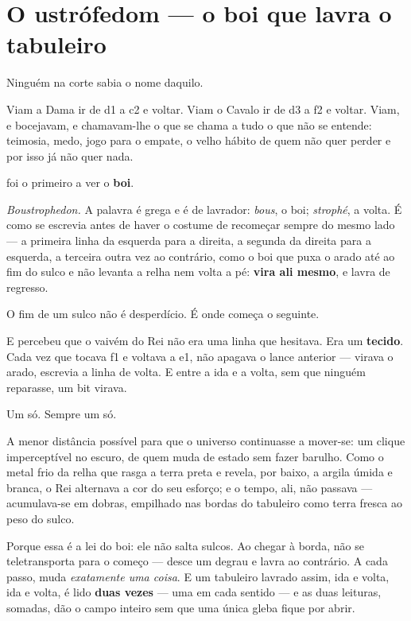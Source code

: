 \documentclass[livro.tex]{subfiles}
\begin{document}
\chapter{O ustrófedom --- o boi que lavra o tabuleiro}

Ninguém na corte sabia o nome daquilo.

Viam a Dama ir de \textsf{d1} a \textsf{c2} e voltar. Viam o Cavalo ir de \textsf{d3} a \textsf{f2} e voltar.
Viam, e bocejavam, e chamavam-lhe o que se chama a tudo o que não se entende:
teimosia, medo, jogo para o empate, o velho hábito de quem não quer perder e por
isso já não quer nada.

\Joa foi o primeiro a ver o \textbf{boi}.

\medskip

\emph{Boustrophedon.} A palavra é grega e é de lavrador: \emph{bous}, o boi;
\emph{strophé}, a volta. É como se escrevia antes de haver o costume de recomeçar
sempre do mesmo lado --- a primeira linha da esquerda para a direita, a segunda da
direita para a esquerda, a terceira outra vez ao contrário, como o boi que puxa o
arado até ao fim do sulco e não levanta a relha nem volta a pé: \textbf{vira ali
mesmo}, e lavra de regresso.

O fim de um sulco não é desperdício. É onde começa o seguinte.

\medskip

E \Joa percebeu que o vaivém do Rei não era uma linha que hesitava. Era um
\textbf{tecido}. Cada vez que \Ben tocava \textsf{f1} e voltava a \textsf{e1}, não apagava o
lance anterior --- virava o arado, escrevia a linha de volta. E entre a ida e a
volta, sem que ninguém reparasse, um bit virava.

Um só. Sempre um só.

\medskip

A menor distância possível para que o universo continuasse a mover-se: um clique
imperceptível no escuro, de quem muda de estado sem fazer barulho. Como o metal frio da
relha que rasga a terra preta e revela, por baixo, a argila úmida e branca, o Rei
alternava a cor do seu esforço; e o tempo, ali, não passava --- acumulava-se em dobras,
empilhado nas bordas do tabuleiro como terra fresca ao peso do sulco.

\medskip

Porque essa é a lei do boi: ele não salta sulcos. Ao chegar à borda, não se
teletransporta para o começo --- desce um degrau e lavra ao contrário. A cada
passo, muda \emph{exatamente uma coisa}. E um tabuleiro lavrado assim, ida e volta,
ida e volta, é lido \textbf{duas vezes} --- uma em cada sentido --- e as duas
leituras, somadas, dão o campo inteiro sem que uma única gleba fique por abrir.
\end{document}
